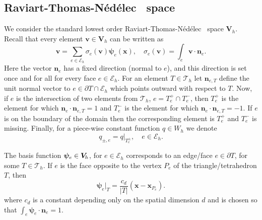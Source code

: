 \documentclass[11pt]{amsart}
\numberwithin{equation}{section}
\theoremstyle{definition}\newtheorem{example}{Example}[section]
\begin{document}
\subsection{Raviart-Thomas-{N\'ed\'elec\ } space} 

We consider the standard lowest order
Raviart-Thomas-{N\'ed\'elec\ } space ${{\boldsymbol V}}_h$. 
Recall that every element ${{\mathbf v}}\in {{\boldsymbol V}}_h$ can be written as
\begin{equation}\label{eq:RT}
{{\mathbf v}} = \sum_{e\in \mathcal{E}_h} \sigma_e({{\mathbf v}} ){{\boldsymbol \psi}}_e({{\mathbf x}}),
\quad \sigma_e({{\mathbf v}})  = \int_e {{\mathbf v}}\cdot{{\mathbf n}}_e.
\end{equation}
Here the vector ${{\mathbf n}}_e$ has a fixed direction (normal to $e$), and
this direction is set once and for all for every
face $e\in \mathcal{E}_h$.  For an element $T\in \mathcal{T}_h$
let ${{\mathbf n}}_{e,T}$ define the unit normal vector to $e\in \partial
T\cap \mathcal{E}_h$ which points outward with respect to $T$. 
Now, if $e$ is the intersection of two elements from
$\mathcal{T}_h$, $e=T_e^+\cap T_e^-$, then $T^+_e$ is the element for
which  ${{\mathbf n}}_e\cdot{{\mathbf n}}_{e,T}=1$ and 
$T^{-}_e$ is the element for which 
${{\mathbf n}}_e\cdot{{\mathbf n}}_{e,T}=-1$.  
If $e$ is on  the boundary of the domain then the corresponding
element is $T^{+}_e$ and $T_e^{-}$ is missing. Finally, for a
piece-wise constant function $q\in W_h$ we denote
\[
q_{\pm,e} = q\big|_{T^\pm_e}, \quad e\in \mathcal{E}_h.
\]

The basis function ${{\boldsymbol \psi}}_e\in {{\boldsymbol V}_{\hspace{-0.2mm}h}}$, for $e\in \mathcal{E}_h$
corresponds to an edge/face $e\in \partial T$, for some $T\in {\mathcal T}_h$. If
$e$ is the face opposite to the vertex $P_e$ of the triangle/tetrahedron $T$,
then
\begin{equation}\label{eq:RT-basis}
{{\boldsymbol \psi}}_e\big|_T = \frac{c_d}{|T|}({{\mathbf x}}-{{\mathbf x}}_{P_e}).
\end{equation}
where $c_d$ is a constant depending only on the spatial dimension $d$
and is chosen so that $\int_e {{\boldsymbol \psi}}_e\cdot{{\mathbf n}}_e = 1$. 
\end{document}
